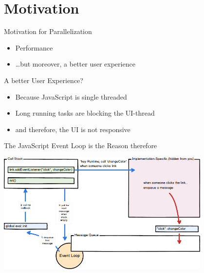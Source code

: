 \section{Motivation}

\begin{frame}[fragile]{Motivation for Parallelization}
	\begin{itemize}[<+->]
		\item Performance
		\item \dots but moreover, a better user experience
	\end{itemize}
\end{frame}

\begin{frame}{A better User Experience?}
	\begin{itemize}
		\item Because JavaScript is single threaded
		\item Long running tasks are blocking the UI-thread
		\item and therefore, the UI is not responsive
	\end{itemize}
\end{frame}

\begin{frame}{The JavaScript Event Loop is the Reason therefore}
	\begin{center}
		\includegraphics[width=0.8\textwidth]{event-loop}\cite{Swenson-Healey2013}
	\end{center}
\end{frame}

